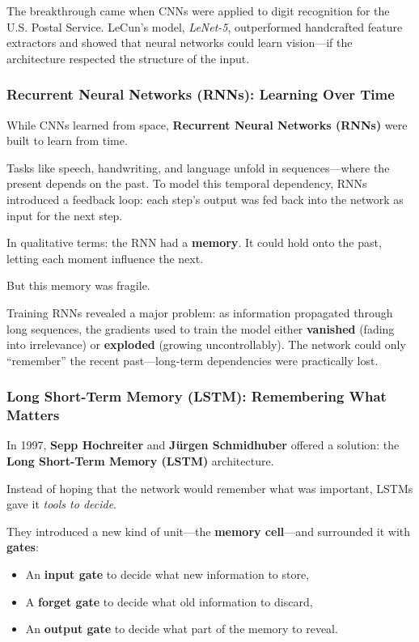 The breakthrough came when CNNs were applied to digit recognition for the U.S. Postal Service. LeCun’s model, \textit{LeNet-5}, outperformed handcrafted feature extractors and showed that neural networks could learn vision—if the architecture respected the structure of the input.

\subsubsection{Recurrent Neural Networks (RNNs): Learning Over Time}

While CNNs learned from space, \textbf{Recurrent Neural Networks (RNNs)} were built to learn from time.

Tasks like speech, handwriting, and language unfold in sequences—where the present depends on the past. To model this temporal dependency, RNNs introduced a feedback loop: each step’s output was fed back into the network as input for the next step.

In qualitative terms: the RNN had a \textbf{memory}. It could hold onto the past, letting each moment influence the next.

But this memory was fragile.

Training RNNs revealed a major problem: as information propagated through long sequences, the gradients used to train the model either \textbf{vanished} (fading into irrelevance) or \textbf{exploded} (growing uncontrollably). The network could only “remember” the recent past—long-term dependencies were practically lost.

\subsubsection{Long Short-Term Memory (LSTM): Remembering What Matters}

In 1997, \textbf{Sepp Hochreiter} and \textbf{Jürgen Schmidhuber} offered a solution: the \textbf{Long Short-Term Memory (LSTM)} architecture.

Instead of hoping that the network would remember what was important, LSTMs gave it \emph{tools to decide}.

They introduced a new kind of unit—the \textbf{memory cell}—and surrounded it with \textbf{gates}:
\begin{itemize}
  \item An \textbf{input gate} to decide what new information to store,
  \item A \textbf{forget gate} to decide what old information to discard,
  \item An \textbf{output gate} to decide what part of the memory to reveal.
\end{itemize}

